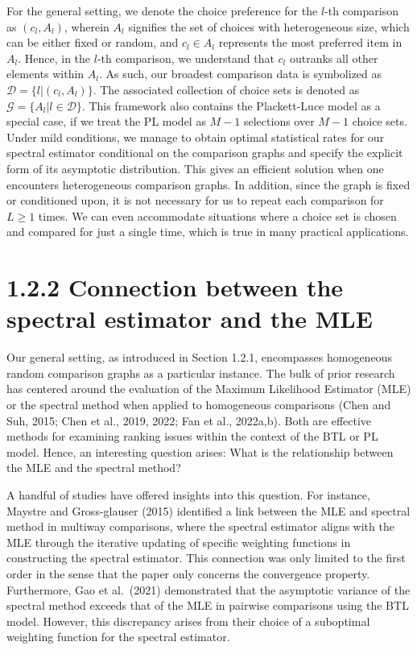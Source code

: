 For the general setting, we denote the choice preference for the \(l\)-th comparison as \((c_{l},A_{l})\), wherein \(A_{l}\) signifies the set of choices with heterogeneous size, which can be either fixed or random, and \(c_{l}\in A_{l}\) represents the most preferred item in \(A_{l}\). Hence, in the \(l\)-th comparison, we understand that \(c_{l}\) outranks all other elements within \(A_{l}\). As such, our broadest comparison data is symbolized as \(\mathcal{D} = \{l|(c_{l},A_{l})\}\). The associated collection of choice sets is denoted as \(\mathcal{G} = \{A_{l}|l\in \mathcal{D}\}\). This framework also contains the Plackett-Luce model as a special case, if we treat the PL model as \(M - 1\) selections over \(M - 1\) choice sets. Under mild conditions, we manage to obtain optimal statistical rates for our spectral estimator conditional on the comparison graphs and specify the explicit form of its asymptotic distribution. This gives an efficient solution when one encounters heterogeneous comparison graphs. In addition, since the graph is fixed or conditioned upon, it is not necessary for us to repeat each comparison for \(L\geq 1\) times. We can even accommodate situations where a choice set is chosen and compared for just a single time, which is true in many practical applications.

\section{1.2.2 Connection between the spectral estimator and the MLE}\label{connection-between-the-spectral-estimator-and-the-mle}

Our general setting, as introduced in Section 1.2.1, encompasses homogeneous random comparison graphs as a particular instance. The bulk of prior research has centered around the evaluation of the Maximum Likelihood Estimator (MLE) or the spectral method when applied to homogeneous comparisons (Chen and Suh, 2015; Chen et al., 2019, 2022; Fan et al., 2022a,b). Both are effective methods for examining ranking issues within the context of the BTL or PL model. Hence, an interesting question arises: What is the relationship between the MLE and the spectral method?

A handful of studies have offered insights into this question. For instance, Maystre and Gross-glauser (2015) identified a link between the MLE and spectral method in multiway comparisons, where the spectral estimator aligns with the MLE through the iterative updating of specific weighting functions in constructing the spectral estimator. This connection was only limited to the first order in the sense that the paper only concerns the convergence property. Furthermore, Gao et al.~(2021) demonstrated that the asymptotic variance of the spectral method exceeds that of the MLE in pairwise comparisons using the BTL model. However, this discrepancy arises from their choice of a suboptimal weighting function for the spectral estimator.

